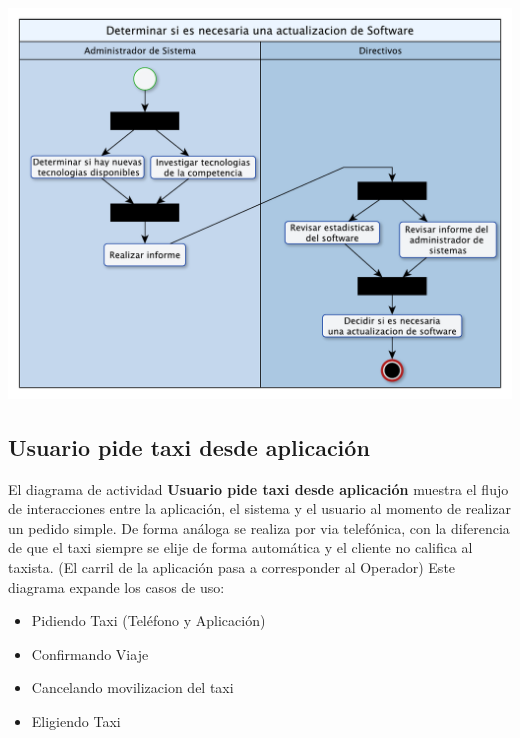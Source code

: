 \documentclass[a4paper]{article}
\begin{document}
\begin{center}
\includegraphics[scale=0.7]{DA_Actualizacion_Soft.pdf}
\end{center}

\subsection{Usuario pide taxi desde aplicaci\'on}
El diagrama de actividad \textbf{Usuario pide taxi desde aplicaci\'on} muestra el flujo de interacciones entre la aplicaci\'on, el sistema y el usuario
al momento de realizar un pedido simple. De forma an\'aloga se realiza por via telef\'onica, con la diferencia de que el taxi siempre se elije de forma autom\'atica y el cliente no califica al taxista. (El carril de la aplicaci\'on pasa a corresponder al Operador)
Este diagrama expande los casos de uso:
\begin{itemize}
\item Pidiendo Taxi (Tel\'efono y Aplicaci\'on)
\item Confirmando Viaje
\item Cancelando movilizacion del taxi
\item Eligiendo Taxi
\end{itemize}
\end{document}

